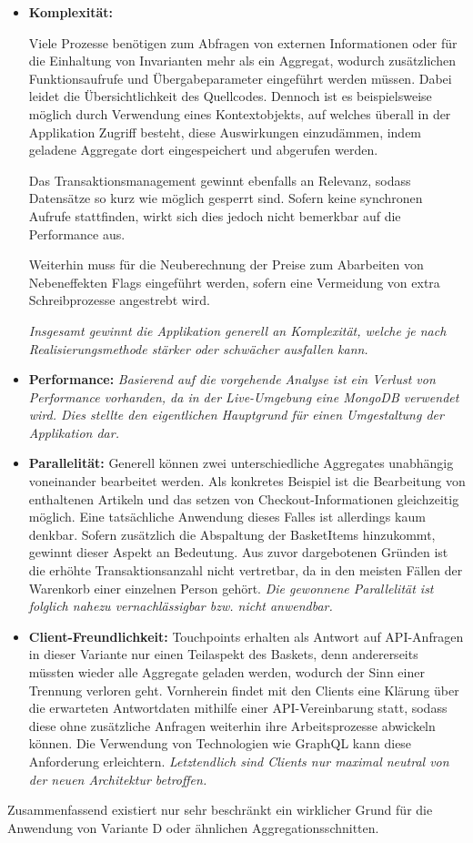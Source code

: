 \begin{itemize}[topsep=-2pt]
	\item \textbf{Komplexität: } {Viele Prozesse benötigen zum Abfragen von externen Informationen oder für die Einhaltung von Invarianten mehr als ein Aggregat, wodurch zusätzlichen Funktionsaufrufe und Übergabeparameter eingeführt werden müssen. Dabei leidet die Übersichtlichkeit des Quellcodes. Dennoch ist es beispielsweise möglich durch Verwendung eines Kontextobjekts, auf welches überall in der Applikation Zugriff besteht, diese Auswirkungen einzudämmen, indem geladene Aggregate dort eingespeichert und abgerufen werden.
		
	Das Transaktionsmanagement gewinnt ebenfalls an Relevanz, sodass Datensätze so kurz wie möglich gesperrt sind. Sofern keine synchronen Aufrufe stattfinden, wirkt sich dies jedoch nicht bemerkbar auf die Performance aus. 
	
	Weiterhin muss für die Neuberechnung der Preise zum Abarbeiten von Nebeneffekten Flags eingeführt werden, sofern eine Vermeidung von extra Schreibprozesse angestrebt wird. 
	
	\emph{Insgesamt gewinnt die Applikation generell an Komplexität, welche je nach Realisierungsmethode stärker oder schwächer ausfallen kann.}}

	\item \textbf{Performance: } { \emph{Basierend auf die vorgehende Analyse ist ein Verlust von Performance vorhanden, da in der Live-Umgebung eine MongoDB verwendet wird. Dies stellte den eigentlichen Hauptgrund für einen Umgestaltung der Applikation dar.} }
	
	\item \textbf{Parallelität: } { Generell können zwei unterschiedliche Aggregates unabhängig voneinander bearbeitet werden. Als konkretes Beispiel ist die Bearbeitung von enthaltenen Artikeln und das setzen von Checkout-Informationen gleichzeitig möglich. Eine tatsächliche Anwendung dieses Falles ist allerdings kaum denkbar. Sofern zusätzlich die Abspaltung der BasketItems hinzukommt, gewinnt dieser Aspekt an Bedeutung. Aus zuvor dargebotenen Gründen ist die erhöhte Transaktionsanzahl nicht vertretbar, da in den meisten Fällen der Warenkorb einer einzelnen Person gehört. \emph{Die gewonnene Parallelität ist folglich nahezu vernachlässigbar bzw. nicht anwendbar.}}
	\item \textbf{Client-Freundlichkeit: } { Touchpoints erhalten als Antwort auf API-Anfragen in dieser Variante nur einen Teilaspekt des Baskets, denn andererseits müssten wieder alle Aggregate geladen werden, wodurch der Sinn einer Trennung verloren geht. Vornherein findet mit den Clients eine Klärung über die erwarteten Antwortdaten mithilfe einer API-Vereinbarung statt, sodass diese ohne zusätzliche Anfragen weiterhin ihre Arbeitsprozesse abwickeln können. Die Verwendung von Technologien wie GraphQL kann diese Anforderung erleichtern. \emph{Letztendlich sind Clients nur maximal neutral von der neuen Architektur betroffen.}}
\end{itemize}

Zusammenfassend existiert nur sehr beschränkt ein wirklicher Grund für die Anwendung von Variante D oder ähnlichen Aggregationsschnitten.

